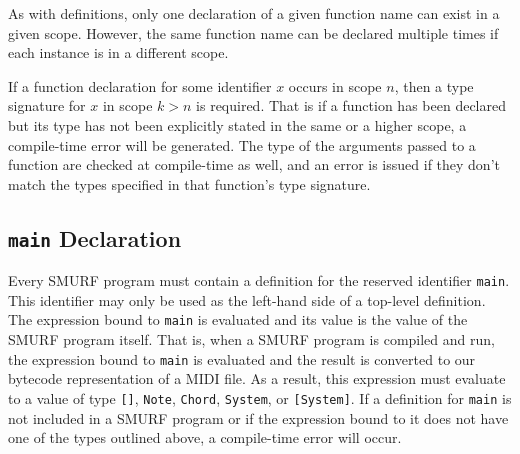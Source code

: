 As with definitions, only one declaration of a given function name can exist
in a given scope. However, the same function name can be declared multiple
times if each instance is in a different scope.

If a function declaration for some identifier $x$ occurs in scope $n$, then
a type signature for $x$ in scope $k>n$ is required. That is if a function has
been declared but its type has not been explicitly stated in the same or a higher
scope, a compile-time error will be generated. The type of the arguments
passed to a function are checked at compile-time as well, and an error
is issued if they don't match the types specified in that function's 
type signature.

\subsection{\texttt{main} Declaration}

Every SMURF program must contain a definition for the reserved identifier \texttt{main}. This
identifier may only be used as the left-hand side of a top-level definition. The expression
bound to \texttt{main} is evaluated and its value is the value of the SMURF program itself.
That is, when a SMURF program is compiled and run, the expression bound to \texttt{main} is
evaluated and the result is converted to our bytecode representation of a MIDI file. As a result,
this expression must evaluate to a value of type \texttt{[]}, \texttt{Note}, \texttt{Chord}, 
\texttt{System}, or \texttt{[System]}. If a definition for \texttt{main} is not included in a 
SMURF program or if the expression bound to it does not have one of the types outlined above,
a compile-time error will occur.

